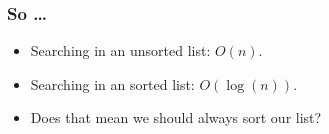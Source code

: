 \begin{frame}
	\frametitle{So \ldots}

				\begin{itemize}
					\item Searching in an unsorted list: $O(n)$.
					\item Searching in an sorted list: $O(\log(n))$.
					\item Does that mean we should always sort our list?
		\end{itemize}	
\end{frame}